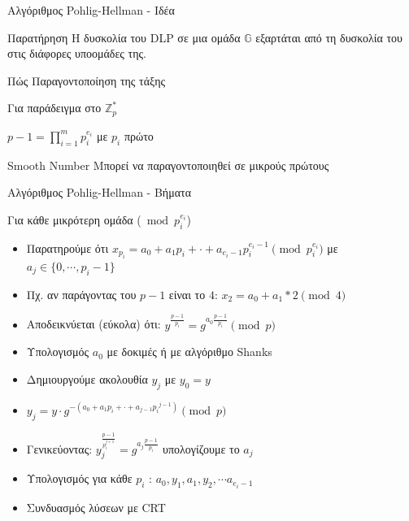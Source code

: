 \documentclass[handout]{beamer}
\begin{document}
\begin{frame}{Αλγόριθμος Pohlig-Hellman - Ιδέα}

\begin{block}{Παρατήρηση}
Η δυσκολία του DLP σε μια ομάδα $\mathbb{G}$ εξαρτάται από τη δυσκολία του στις διάφορες υποομάδες της.
\end{block}
\pause
\begin{block}{Πώς}
Παραγοντοποίηση της τάξης

Για παράδειγμα στο $\mathbb{Z}_p^*$
\begin{center}
$p-1 = \prod_{i=1}^m p_i^{e_i}$ με $p_i$ πρώτο
\end{center}
\end{block}
\pause
\begin{block}{Smooth Number}
Μπορεί να παραγοντοποιηθεί σε μικρούς πρώτους
\end{block}
\end{frame}

\begin{frame}{Αλγόριθμος Pohlig-Hellman - Βήματα}
\begin{small}
Για κάθε μικρότερη ομάδα ($\bmod{p_i^{e_i}}$)
\begin{itemize}
\item Παρατηρούμε ότι $x_{p_i} = a_0+a_1p_i+\cdot+a_{e_i-1}p_i^{e_i-1} \pmod{p_i^{e_i}}$ με $a_j \in \{0,\cdots,p_{i}-1\}$ \pause
\item Πχ. αν παράγοντας του $p-1$ είναι το $4$: $x_2 = a_0 + a_1 *2 \pmod{4}$ \pause
\item Αποδεικνύεται (εύκολα) ότι: $y^\frac{p-1}{p_i} = g^{a_0\frac{p-1}{p_i}} \pmod{p}$ \pause
\item Υπολογισμός $a_0$ με δοκιμές ή με αλγόριθμο Shanks \pause
\item Δημιουργούμε ακολουθία $y_j$ με $y_0=y$ \pause
\item $y_{j} = y \cdot g^{-(a_0+a_1p_i+\cdot+a_{j-1}{p_i}^{j-1})} \pmod{p}$ \pause
\item Γενικεύοντας: $y_{j}^\frac{p-1}{p_i^{j+1}} = g^{a_j \frac{p-1}{p_i}}$ υπολογίζουμε το $a_j$ \pause
\item Υπολογισμός για κάθε $p_i$ : $ a_0, y_1, a_1, y_2, \cdots a_{e_i-1}$ \pause
\item Συνδυασμός λύσεων με CRT \pause
\end{itemize}
\end{small}
\end{frame}
\end{document}
